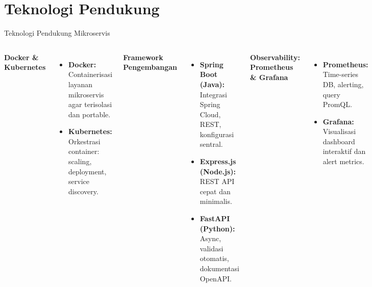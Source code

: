 \documentclass[aspectratio=169, table]{beamer}
\begin{document}
\section{Teknologi Pendukung}
\begin{frame}[fragile]{Teknologi Pendukung Mikroservis}
	\vspace{20pt}
	\small
	\begin{columns}[T]
		\textbf{Docker \& Kubernetes}
		
		\begin{itemize}
			\item \textbf{Docker:} Containerisasi layanan mikroservis agar terisolasi dan portable.
			\item \textbf{Kubernetes:} Orkestrasi container: scaling, deployment, service discovery.
		\end{itemize}
		
		\vspace{5pt}
		\textbf{Framework Pengembangan}
		\begin{itemize}
			\item \textbf{Spring Boot (Java):} Integrasi Spring Cloud, REST, konfigurasi sentral.
			\item \textbf{Express.js (Node.js):} REST API cepat dan minimalis.
			\item \textbf{FastAPI (Python):} Async, validasi otomatis, dokumentasi OpenAPI.
		\end{itemize}
		
		\textbf{Observability: Prometheus \& Grafana}
		
		\begin{itemize}
			\item \textbf{Prometheus:} Time-series DB, alerting, query PromQL.
			\item \textbf{Grafana:} Visualisasi dashboard interaktif dan alert metrics.
		\end{itemize}
		
		\vspace{5pt}
		\textbf{Service Mesh: Istio \& Linkerd}
		\begin{itemize}
			\item \textbf{Istio:} Envoy proxy, telemetry, keamanan, tracing (Jaeger/Zipkin).
			\item \textbf{Linkerd:} Lightweight, setup sederhana, efisien untuk pemula.
		\end{itemize}
	\end{columns}
\end{frame}
\end{document}
